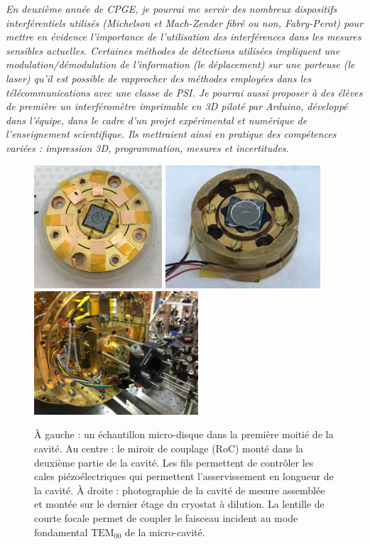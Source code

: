 \documentclass[12pt,a4paper]{article}
\newcommand{\uroc}{\micro RoC}
\begin{document}
\textit{En deuxième année de CPGE, je pourrai me servir des nombreux dispositifs interférentiels utilisés (Michelson et Mach-Zender fibré ou non, Fabry-Perot) pour mettre en évidence l'importance de l'utilisation des interférences dans les mesures sensibles actuelles.
Certaines méthodes de détections utilisées impliquent une modulation/démodulation de l'information (le déplacement) sur une porteuse (le laser) qu'il est possible de rapprocher des méthodes employées dans les télécommunications avec une classe de PSI.
Je pourrai aussi proposer à des élèves de première un interféromètre imprimable en 3D piloté par Arduino, développé dans l'équipe, dans le cadre d'un projet expérimental et numérique de l'enseignement scientifique.
Ils mettraient ainsi en pratique des compétences variées : impression 3D, programmation, mesures et incertitudes.}

\begin{figure}
\center
\includegraphics[height=130pt]{figures/cavity_microwheel.jpg}
\includegraphics[height=130pt]{figures/cavity_uroc.jpg}
\includegraphics[height=130pt]{figures/IMG_1766.JPG}
\caption{À gauche : un échantillon micro-disque dans la première moitié de la cavité.
Au centre : le miroir de couplage (\uroc) monté dans la deuxième partie de la cavité.
Les fils permettent de contrôler les cales piézoélectriques qui permettent l'asservissement en longueur de la cavité.
À droite : photographie de la cavité de mesure assemblée et montée sur le dernier étage du cryostat à dilution.
La lentille de courte focale permet de coupler le faisceau incident au mode fondamental $\mathrm{TEM_{00}}$ de la micro-cavité.}
\label{fig:cavity}
\end{figure}
\end{document}
